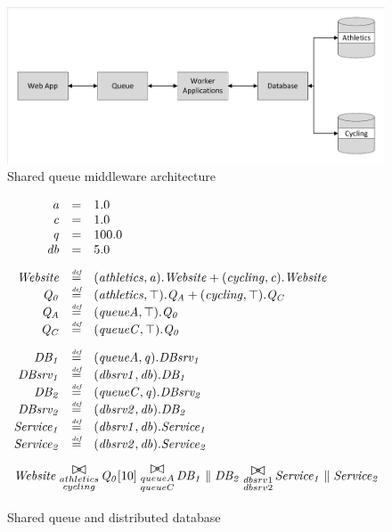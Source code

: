 \begin{figure}
	\label{figure:queuedd_architecture}
	\centering
	\includegraphics[trim = 5 5 5 5, clip, width=\textwidth]{img/sharedqueue}
	\caption{Shared queue middleware architecture}
\end{figure}

\begin{figure}
	\label{figure:queuedd}
	\centering
	\begin{displaymath}
	\begin{array}{rcl}
	\mathit{a} & = & 1.0\\
	\mathit{c} & = & 1.0\\
	\mathit{q} & = & 100.0\\
	\mathit{db} & = & 5.0\\
	[2.0ex]		\mathit{Website} & \rmdef & (\mathit{athletics},\mathit{a}).\mathit{Website}+(\mathit{cycling},\mathit{c}).\mathit{Website}\\
	\mathit{Q_0} & \rmdef & (\mathit{athletics},\top).\mathit{Q_A}+(\mathit{cycling},\top).\mathit{Q_C}\\
	\mathit{Q_A} & \rmdef & (\mathit{queueA},\top).\mathit{Q_0}\\
	\mathit{Q_C} & \rmdef & (\mathit{queueC},\top).\mathit{Q_0}\\
	[2.0ex]		\mathit{DB_1} & \rmdef & (\mathit{queueA},\mathit{q}).\mathit{DBsrv_1}\\
	\mathit{DBsrv_1} & \rmdef & (\mathit{dbsrv1},\mathit{db}).\mathit{DB_1}\\
	\mathit{DB_2} & \rmdef & (\mathit{queueC},\mathit{q}).\mathit{DBsrv_2}\\
	\mathit{DBsrv_2} & \rmdef & (\mathit{dbsrv2},\mathit{db}).\mathit{DB_2}\\
	\mathit{Service_1} & \rmdef & (\mathit{dbsrv1},\mathit{db}).\mathit{Service_1}\\
	\mathit{Service_2} & \rmdef & (\mathit{dbsrv2},\mathit{db}).\mathit{Service_2}\\
	[2.0ex]		\multicolumn{3}{l}{\mathit{Website}\sync{\substack{athletics\\cycling}}\mathit{Q_0}[10]\sync{\substack{queueA\\queueC}}\mathit{DB_1}\parallel\mathit{DB_2}\sync{\substack{dbsrv1\\dbsrv2}}\mathit{Service_1}\parallel\mathit{Service_2}}\\
	[2.0ex]	\end{array}
	\end{displaymath}
	\caption{Shared queue and distributed database}
\end{figure}


